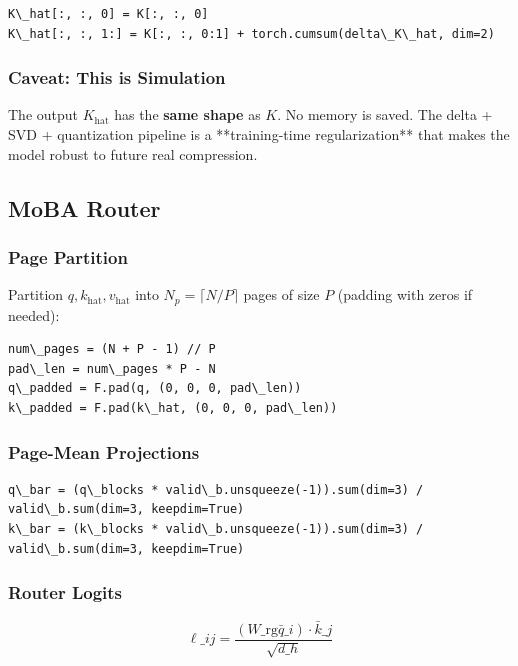 \begin{lstlisting}
K\_hat[:, :, 0] = K[:, :, 0]
K\_hat[:, :, 1:] = K[:, :, 0:1] + torch.cumsum(delta\_K\_hat, dim=2)
\end{lstlisting}

\subsubsection{Caveat: This is Simulation}

The output $K_\text{hat}$ has the \textbf{same shape} as $K$. No memory is 
saved. The delta + SVD + quantization pipeline is a **training-time 
regularization** that makes the model robust to future real compression.

\subsection{MoBA Router}

\subsubsection{Page Partition}

Partition $q, k_\text{hat}, v_\text{hat}$ into $N_p = \lceil N / P \rceil$ 
pages of size $P$ (padding with zeros if needed):

\begin{lstlisting}
num\_pages = (N + P - 1) // P
pad\_len = num\_pages * P - N
q\_padded = F.pad(q, (0, 0, 0, pad\_len))
k\_padded = F.pad(k\_hat, (0, 0, 0, pad\_len))
\end{lstlisting}

\subsubsection{Page-Mean Projections}

\begin{lstlisting}
q\_bar = (q\_blocks * valid\_b.unsqueeze(-1)).sum(dim=3) / valid\_b.sum(dim=3, keepdim=True)
k\_bar = (k\_blocks * valid\_b.unsqueeze(-1)).sum(dim=3) / valid\_b.sum(dim=3, keepdim=True)
\end{lstlisting}

\subsubsection{Router Logits}

\[
\ell\_{ij} = \frac{(W\_\text{rg} \bar{q}\_i) \cdot \bar{k}\_j}{\sqrt{d\_h}}
\tag{4.1}
\]

